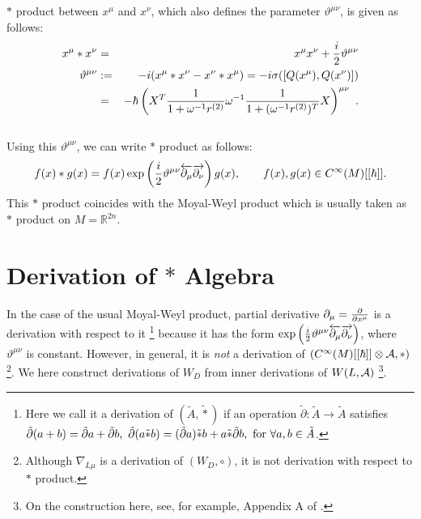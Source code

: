 \documentclass[10pt,a4paper]{article}
\def\h{\hbar}
\begin{document}
$*$ product between $x^\mu$ and $x^\nu$, which also defines the parameter $\vartheta^{\mu\nu}$, is given as follows:
\begin{eqnarray}
x^\mu*x^\nu&=&x^\mu x^\nu+{i\over2}\vartheta^{\mu\nu}\nonumber\\
\vartheta^{\mu\nu}&:=&-i(x^\mu*x^\nu-x^\nu*x^\mu)=
      -i\sigma([Q(x^\mu),Q(x^\nu)])\nonumber\\
      &=&-\h\left(X^T{1\over{1+ \omega^{-1}r^{(2)}}}\omega^{-1}{1\over{1+ (\omega^{-1}r^{(2)}})^T}X\right)^{\mu\nu} \ .
\end{eqnarray}\\

Using this $\vartheta^{\mu\nu}$, we can write $*$ product as follows:
\begin{equation}
f(x)*g(x)=f(x)\exp\left({i\over2}\vartheta^{\mu\nu}\overleftarrow{\partial_\mu}\overrightarrow{\partial_\nu}\right)g(x),\quad\quad f(x),g(x)\in C^{\infty}(M)[[\h]].
\end{equation}
This $*$ product coincides with the Moyal-Weyl product which is usually taken as $*$ product on $M={\mathbb R}^{2n}$.


\section{Derivation of $*$ Algebra
\label{sec:deri}}
In the case of the usual Moyal-Weyl product, partial derivative $\partial_\mu={\partial\over\partial x^\mu}$ is a derivation with respect to it
\footnote{
Here we call it a derivation of $({\tilde A},{\tilde *})$ if an operation ${\tilde \partial}:{\tilde A}\rightarrow{\tilde A}$ satisfies ${\tilde \partial}(a+b)={\tilde \partial}a+{\tilde \partial}b, \ {\tilde \partial}(a{\tilde *}b)=({\tilde \partial}a){\tilde *}b+a{\tilde *}{\tilde \partial}b,\ {\rm for}\ \forall a,b\in{\tilde A}$.
} 
because it has the form $\exp\left({i\over2}\vartheta^{\mu\nu}\overleftarrow{\partial_\mu}\overrightarrow{\partial_\nu}\right)$, where $\vartheta^{\mu\nu}$ is constant. 
However, in general, it is {\it not} a derivation of $(C^\infty(M)[[\h]]\otimes {\cal A},*)$  
\footnote{
Although $\nabla_{L\mu}$ is a derivation of $(W_D,\circ)$, it is not derivation with respect to $*$ product.
}.
We here construct derivations of $W_D$ from inner derivations of $W(L,{\cal A})$
\footnote{
On the construction here, see, for example, Appendix A of \cite{Xu}.
}.\\
\end{document}
